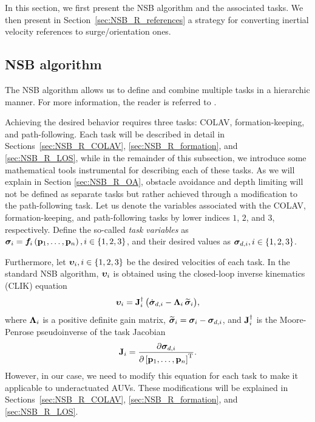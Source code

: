 In this section, we first present the NSB algorithm and the associated tasks.
We then present in Section~\ref{sec:NSB_R_references} a strategy for converting inertial velocity references to surge/orientation ones.

\subsection{NSB algorithm}
\label{sec:NSB_R_NSB}

The NSB algorithm allows us to define and combine multiple tasks in a hierarchic manner.
For more information, the reader is referred to \cite{antonelli_2006_kinematic}.

Achieving the desired behavior requires three tasks: COLAV, formation-keeping, and path-following.
Each task will be described in detail in Sections~\ref{sec:NSB_R_COLAV}, \ref{sec:NSB_R_formation}, and \ref{sec:NSB_R_LOS}, while in the remainder of this subsection, we introduce some mathematical tools instrumental for describing each of these tasks.
As we will explain in Section \ref{sec:NSB_R_OA}, obstacle avoidance and depth limiting will not be defined as separate tasks but rather achieved through a modification to the path-following task.
Let us denote the variables associated with the COLAV, formation-keeping, and path-following tasks by lower indices $1$, $2$, and $3$, respectively.
Define the so-called \emph{task variables} as $\bm{\sigma}_i = \bm{f}_i\left(\mathbf{p}_1, \ldots, \mathbf{p}_n\right), i \in \left\{1,2,3\right\}$, and their desired values as $\bm{\sigma}_{d,i}, i \in \left\{1,2,3\right\}$.

Furthermore, let $\bm{\upsilon}_i, i \in \left\{1,2,3\right\}$ be the desired velocities of each task.    
In the standard NSB algorithm, $\bm{\upsilon}_i$ is obtained using the closed-loop inverse kinematics (CLIK) equation \cite{antonelli_2006_kinematic} 
\begin{equation}
    \label{eq:NSB_R_CLIK}
    \bm{\upsilon}_i = \mathbf{J}_i^{\dagger}\,\bigl(\dot{\bm{\sigma}}_{d,i} - \bm{\Lambda}_i\,\widetilde{\bm{\sigma}}_i\bigr),
\end{equation}
where $\bm{\Lambda}_i$ is a positive definite gain matrix, $\widetilde{\bm{\sigma}}_i = \bm{\sigma}_i - \bm{\sigma}_{d, i}$, and $\mathbf{J}_i^{\dagger}$ is the Moore-Penrose pseudoinverse of the task Jacobian 
\begin{equation}
    \mathbf{J}_i = \frac{\partial \bm{\sigma}_{d,i}}{\partial \left[\mathbf{p}_1, \ldots, \mathbf{p}_n\right]^{\mathrm{T}}}.
\end{equation}
However, in our case, we need to modify this equation for each task to make it applicable to underactuated AUVs.
These modifications will be explained in Sections~\ref{sec:NSB_R_COLAV}, \ref{sec:NSB_R_formation}, and \ref{sec:NSB_R_LOS}.

